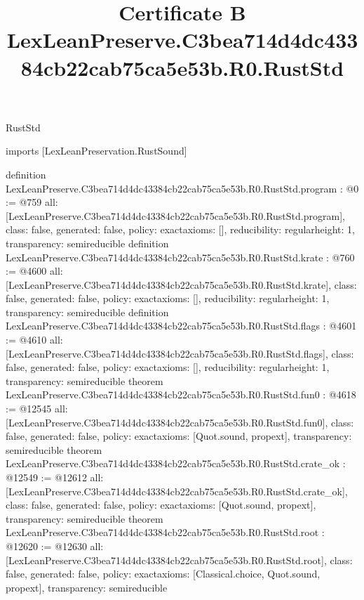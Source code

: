 \begin{lexlean}{RustStd}
\title{Certificate B LexLeanPreserve.C3bea714d4dc43384cb22cab75ca5e53b.R0.RustStd}
\begin{coremodule}
imports [LexLeanPreservation.RustSound]

definition LexLeanPreserve.C3bea714d4dc43384cb22cab75ca5e53b.R0.RustStd.program : @0 := @759 {
  all: [LexLeanPreserve.C3bea714d4dc43384cb22cab75ca5e53b.R0.RustStd.program],
  class: false,
  generated: false,
  policy: exact{axioms: []},
  reducibility: regular{height: 1},
  transparency: semireducible
}
definition LexLeanPreserve.C3bea714d4dc43384cb22cab75ca5e53b.R0.RustStd.krate : @760 := @4600 {
  all: [LexLeanPreserve.C3bea714d4dc43384cb22cab75ca5e53b.R0.RustStd.krate],
  class: false,
  generated: false,
  policy: exact{axioms: []},
  reducibility: regular{height: 1},
  transparency: semireducible
}
definition LexLeanPreserve.C3bea714d4dc43384cb22cab75ca5e53b.R0.RustStd.flags : @4601 := @4610 {
  all: [LexLeanPreserve.C3bea714d4dc43384cb22cab75ca5e53b.R0.RustStd.flags],
  class: false,
  generated: false,
  policy: exact{axioms: []},
  reducibility: regular{height: 1},
  transparency: semireducible
}
theorem LexLeanPreserve.C3bea714d4dc43384cb22cab75ca5e53b.R0.RustStd.fun0 : @4618 := @12545 {
  all: [LexLeanPreserve.C3bea714d4dc43384cb22cab75ca5e53b.R0.RustStd.fun0],
  class: false,
  generated: false,
  policy: exact{axioms: [Quot.sound, propext]},
  transparency: semireducible
}
theorem LexLeanPreserve.C3bea714d4dc43384cb22cab75ca5e53b.R0.RustStd.crate_ok : @12549 := @12612 {
  all: [LexLeanPreserve.C3bea714d4dc43384cb22cab75ca5e53b.R0.RustStd.crate_ok],
  class: false,
  generated: false,
  policy: exact{axioms: [Quot.sound, propext]},
  transparency: semireducible
}
theorem LexLeanPreserve.C3bea714d4dc43384cb22cab75ca5e53b.R0.RustStd.root : @12620 := @12630 {
  all: [LexLeanPreserve.C3bea714d4dc43384cb22cab75ca5e53b.R0.RustStd.root],
  class: false,
  generated: false,
  policy: exact{axioms: [Classical.choice, Quot.sound, propext]},
  transparency: semireducible
}


\end{coremodule}
\end{lexlean}
